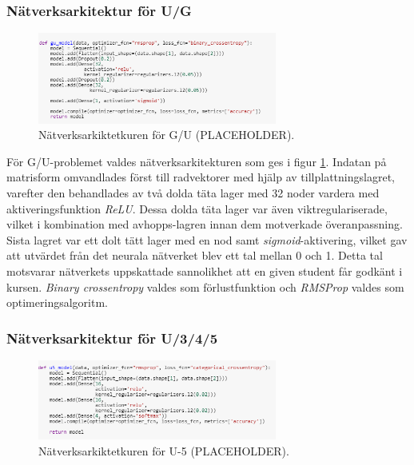 \subsubsection{Nätverksarkitektur för U/G}
\label{sec:gu}
\begin{figure}[H]
    \centering
    \includegraphics[width=0.7\textwidth]{images/methodpictures/gu_placeholder.png}
    \caption{Nätverksarkiktetkuren för G/U (PLACEHOLDER).}
    \label{fig:gu_model}
\end{figure}
För G/U-problemet valdes nätverksarkitekturen som ges i figur \ref{fig:gu_model}. Indatan på matrisform omvandlades först till radvektorer med hjälp av tillplattningslagret, varefter den behandlades av två dolda täta lager med 32 noder vardera med aktiveringsfunktion \emph{ReLU}. Dessa dolda täta lager var även viktregulariserade, vilket i kombination med avhopps-lagren innan dem motverkade överanpassning. Sista lagret var ett dolt tätt lager med en nod samt \emph{sigmoid}-aktivering, vilket gav att utvärdet från det neurala nätverket blev ett tal mellan 0 och 1. Detta tal motsvarar nätverkets uppskattade sannolikhet att en given student får godkänt i kursen. \emph{Binary crossentropy} valdes som förlustfunktion och \emph{RMSProp} valdes som optimeringsalgoritm. 


\subsubsection{Nätverksarkitektur för U/3/4/5}
\label{sec:u5}
\begin{figure}[H]
    \centering
    \includegraphics[width=0.7\textwidth]{images/methodpictures/u5_placeholder.png}
    \caption{Nätverksarkiktetkuren för U-5 (PLACEHOLDER).}
    \label{fig:u5_model}
\end{figure}

